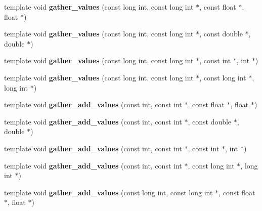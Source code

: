 \begin{DoxyCompactItemize}
\mbox{\label{namespaceschwz_a758923b00d860044630d1b5cd4c4235a}} 
template void {\bfseries gather\+\_\+values} (const long int, const long int $\ast$, const float $\ast$, float $\ast$)
\item 
\mbox{\label{namespaceschwz_a71821c9bb49d9dc02bcdad25f414bf35}} 
template void {\bfseries gather\+\_\+values} (const long int, const long int $\ast$, const double $\ast$, double $\ast$)
\item 
\mbox{\label{namespaceschwz_a3d12e403a66aba1b9d5b5a08d8e3013b}} 
template void {\bfseries gather\+\_\+values} (const long int, const long int $\ast$, const int $\ast$, int $\ast$)
\item 
\mbox{\label{namespaceschwz_a3d79bead3c437129ee3f0e4fb9539a2e}} 
template void {\bfseries gather\+\_\+values} (const long int, const long int $\ast$, const long int $\ast$, long int $\ast$)
\item 
\mbox{\label{namespaceschwz_a608fa0d41c169ac77975688d1192ca9b}} 
template void {\bfseries gather\+\_\+add\+\_\+values} (const int, const int $\ast$, const float $\ast$, float $\ast$)
\item 
\mbox{\label{namespaceschwz_ae44b8950fbaff078114f2fd70dae814d}} 
template void {\bfseries gather\+\_\+add\+\_\+values} (const int, const int $\ast$, const double $\ast$, double $\ast$)
\item 
\mbox{\label{namespaceschwz_aaa932205d942d675ce5193c901b51ca8}} 
template void {\bfseries gather\+\_\+add\+\_\+values} (const int, const int $\ast$, const int $\ast$, int $\ast$)
\item 
\mbox{\label{namespaceschwz_a19bce0fe76febda77ab85a7a42e9f246}} 
template void {\bfseries gather\+\_\+add\+\_\+values} (const int, const int $\ast$, const long int $\ast$, long int $\ast$)
\item 
\mbox{\label{namespaceschwz_aed13f03b9a8d44eb43ce16ea4dd489a0}} 
template void {\bfseries gather\+\_\+add\+\_\+values} (const long int, const long int $\ast$, const float $\ast$, float $\ast$)

\end{DoxyCompactItemize}
